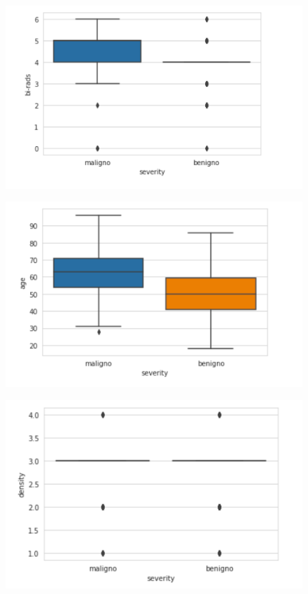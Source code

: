 \documentclass[a4paper,11pt]{book}
\begin{document}
\begin{figure}[H]
	\centering
	\includegraphics[width=0.8\linewidth]{img/box1}
	\caption{}
	\label{fig:box1}
\end{figure}
\begin{figure}[H]
	\centering
	\includegraphics[width=0.8\linewidth]{img/box2}
	\caption{}
	\label{fig:box2}
\end{figure}
\begin{figure}[H]
	\centering
	\includegraphics[width=0.8\linewidth]{img/box3}
	\caption{}
	\label{fig:box3}
\end{figure}
\end{document}
